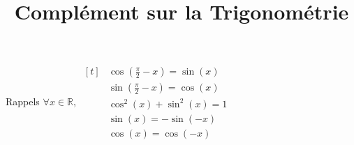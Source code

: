 \documentclass{cours}
\title{Complément sur la Trigonométrie}
\let\frac\tfrac %
\begin{document}

    \begin{Gpartie}{Rappels}
        $\forall x\in\mathbb{R},~
        \begin{aligned}[t]&\cos\left(\frac{\pi}{2}-x\right)=\sin(x) \\
            &\sin\left(\frac{\pi}{2}-x\right)=\cos(x) \\
            &\cos^2(x)+\sin^2(x)=1 \\
            &\sin(x)=-\sin(-x) \\
            &\cos(x)=\cos(-x)
        \end{aligned}$
    \end{Gpartie}
\end{document}

